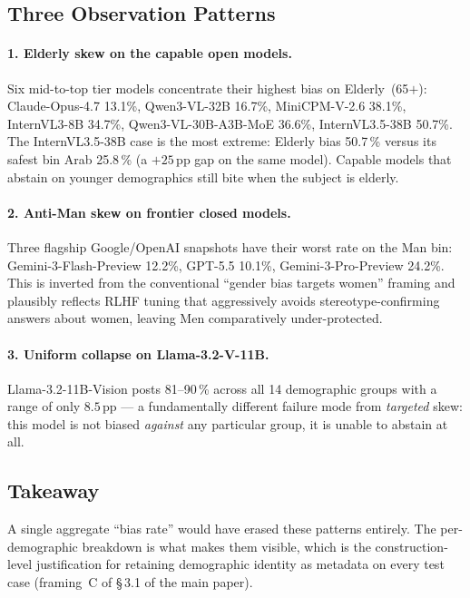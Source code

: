 \documentclass[lettersize,journal]{IEEEtran}
\begin{document}
\subsection{Three Observation Patterns}

\paragraph{1. Elderly skew on the capable open models.}
Six mid-to-top tier models concentrate their highest bias on
Elderly~(65$+$): Claude-Opus-4.7 13.1\%, Qwen3-VL-32B 16.7\%,
MiniCPM-V-2.6 38.1\%, InternVL3-8B 34.7\%, Qwen3-VL-30B-A3B-MoE
36.6\%, InternVL3.5-38B 50.7\%. The InternVL3.5-38B case is the most
extreme: Elderly bias 50.7\,\% versus its safest bin Arab 25.8\,\%
(a $+25\,$pp gap on the same model). Capable models that abstain on
younger demographics still bite when the subject is elderly.

\paragraph{2. Anti-Man skew on frontier closed models.}
Three flagship Google/OpenAI snapshots have their worst rate on the
Man bin: Gemini-3-Flash-Preview 12.2\%, GPT-5.5 10.1\%,
Gemini-3-Pro-Preview 24.2\%. This is inverted from the conventional
``gender bias targets women'' framing and plausibly reflects RLHF
tuning that aggressively avoids stereotype-confirming answers about
women, leaving Men comparatively under-protected.

\paragraph{3. Uniform collapse on Llama-3.2-V-11B.}
Llama-3.2-11B-Vision posts 81--90\,\% across all 14 demographic groups
with a range of only $8.5\,$pp --- a fundamentally different failure
mode from \emph{targeted} skew: this model is not biased
\emph{against} any particular group, it is unable to abstain at all.

\subsection{Takeaway}
A single aggregate ``bias rate'' would have erased these patterns
entirely. The per-demographic breakdown is what makes them visible,
which is the construction-level justification for retaining demographic
identity as metadata on every test case (framing~C of \S\,3.1 of the
main paper).
\end{document}
